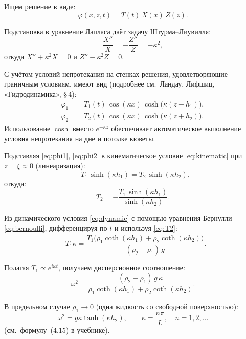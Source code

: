 \documentclass[a4paper,12pt]{article}
\begin{document}
Ищем решение в виде:
\begin{equation}
    \varphi(x, z, t) = T(t)\, X(x)\, Z(z).
\end{equation}

Подстановка в уравнение Лапласа даёт задачу Штурма–Лиувилля:
\begin{equation}
    \frac{X''}{X} = -\frac{Z''}{Z} = -\kappa^2,
\end{equation}
откуда $X'' + \kappa^2 X = 0$ и $Z'' - \kappa^2 Z = 0$.

С учётом условий непротекания на стенках решения, удовлетворяющие
граничным условиям, имеют вид (подробнее см.~Ландау, Лифшиц,
«Гидродинамика», \S\,4):
\begin{align}
    \varphi_1 &= T_1(t)\,\cos(\kappa x)\,
                 \cosh\!\bigl(\kappa(z - h_1)\bigr), \label{eq:phi1} \\
    \varphi_2 &= T_2(t)\,\cos(\kappa x)\,
                 \cosh\!\bigl(\kappa(z + h_2)\bigr). \label{eq:phi2}
\end{align}
Использование $\cosh$ вместо $e^{\pm\kappa z}$ обеспечивает автоматическое
выполнение условия непротекания на дне и потолке кюветы.

Подставляя \eqref{eq:phi1}, \eqref{eq:phi2} в кинематическое условие
\eqref{eq:kinematic} при $z = \xi \approx 0$ (линеаризация):
\begin{equation}
    -T_1\,\sinh(\kappa h_1) = T_2\,\sinh(\kappa h_2),
\end{equation}
откуда:
\begin{equation}
    T_2 = -\frac{T_1\,\sinh(\kappa h_1)}{\sinh(\kappa h_2)}.
    \label{eq:T2}
\end{equation}

Из динамического условия \eqref{eq:dynamic} с помощью уравнения Бернулли
\eqref{eq:bernoulli}, дифференцируя по $t$ и используя \eqref{eq:T2}:
\begin{equation}
    -T_1\kappa =
    \frac{\ddot{T}_1\bigl(\rho_1\coth(\kappa h_1)
    + \rho_2\coth(\kappa h_2)\bigr)}{(\rho_2 - \rho_1)\,g}.
\end{equation}

Полагая $T_1 \propto e^{i\omega t}$, получаем дисперсионное соотношение:
\begin{equation}
    \omega^2 = \frac{(\rho_2 - \rho_1)\,g\,\kappa}
                    {\rho_1\coth(\kappa h_1) + \rho_2\coth(\kappa h_2)}.
    \label{eq:dispersion}
\end{equation}

В предельном случае $\rho_1 \to 0$ (одна жидкость со свободной поверхностью):
\begin{equation}
    \omega^2 = g\kappa\tanh(\kappa h_2),
    \qquad \kappa = \frac{n\pi}{L}, \quad n = 1, 2, \ldots
    \label{eq:dispersion_simple}
\end{equation}
(см.~формулу~(4.15) в учебнике).
\end{document}
